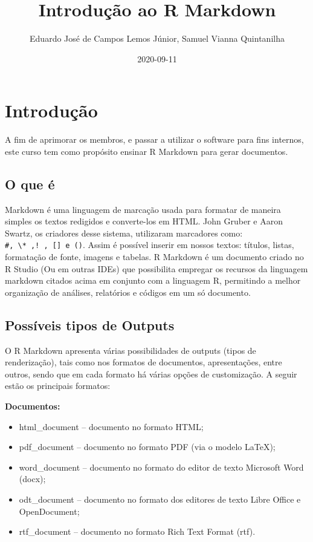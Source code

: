 \documentclass[
]{book}
\title{Introdução ao R Markdown}
\author{Eduardo José de Campos Lemos Júnior, Samuel Vianna Quintanilha}
\date{2020-09-11}
\providecommand{\tightlist}{%
  \setlength{\itemsep}{0pt}\setlength{\parskip}{0pt}}
\begin{document}
\maketitle

{
\setcounter{tocdepth}{1}
\tableofcontents
}
\hypertarget{intro}{%
\chapter{Introdução}\label{intro}}

A fim de aprimorar os membros, e passar a utilizar o software para fins internos, este curso tem como propósito ensinar R Markdown para gerar documentos.

\hypertarget{o-que-uxe9}{%
\section{O que é}\label{o-que-uxe9}}

Markdown é uma linguagem de marcação usada para formatar de maneira simples os textos redigidos e converte-los em HTML. John Gruber e Aaron Swartz, os criadores desse sistema, utilizaram marcadores como: \texttt{\#,\ \textbackslash{}*\ ,!\ ,\ {[}{]}\ e\ ()}. Assim é possível inserir em nossos textos: títulos, listas, formatação de fonte, imagens e tabelas.
R Markdown é um documento criado no R Studio (Ou em outras IDEs) que possibilita empregar os recursos da linguagem markdown citados acima em conjunto com a linguagem R, permitindo a melhor organização de análises, relatórios e códigos em um só documento.

\hypertarget{possuxedveis-tipos-de-outputs}{%
\section{Possíveis tipos de Outputs}\label{possuxedveis-tipos-de-outputs}}

O R Markdown apresenta várias possibilidades de outputs (tipos de renderização), tais como nos formatos de documentos, apresentações, entre outros, sendo que em cada formato há várias opções de customização. A seguir estão os principais formatos:

\textbf{Documentos:}

\begin{itemize}
\tightlist
\item
  html\_document -- documento no formato HTML;
\item
  pdf\_document -- documento no formato PDF (via o modelo LaTeX);
\item
  word\_document -- documento no formato do editor de texto Microsoft Word (docx);
\item
  odt\_document -- documento no formato dos editores de texto Libre Office e OpenDocument;
\item
  rtf\_document -- documento no formato Rich Text Format (rtf).
\end{itemize}
\end{document}
